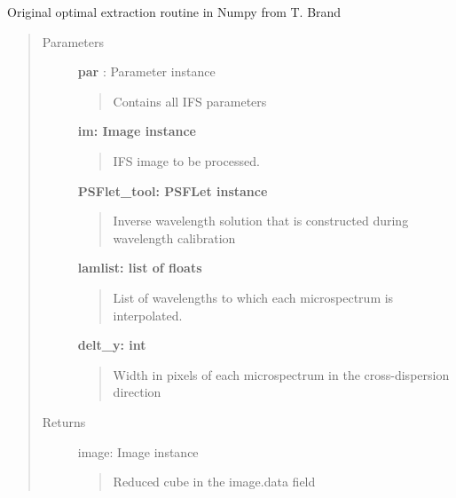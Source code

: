 \documentclass[letterpaper,10pt,english]{sphinxmanual}
\begin{document}

\begin{fulllineitems}
\label{tools:tools.reduction.fitspec_intpix_np}
Original optimal extraction routine in Numpy from T. Brand
\begin{quote}\begin{description}
\item[{Parameters}] \leavevmode
\textbf{par} :   Parameter instance
\begin{quote}

Contains all IFS parameters
\end{quote}

\textbf{im:     Image instance}
\begin{quote}

IFS image to be processed.
\end{quote}

\textbf{PSFlet\_tool: PSFLet instance}
\begin{quote}

Inverse wavelength solution that is constructed during wavelength calibration
\end{quote}

\textbf{lamlist: list of floats}
\begin{quote}

List of wavelengths to which each microspectrum is interpolated.
\end{quote}

\textbf{delt\_y: int}
\begin{quote}

Width in pixels of each microspectrum in the cross-dispersion direction
\end{quote}

\item[{Returns}] \leavevmode
image:  Image instance
\begin{quote}

Reduced cube in the image.data field
\end{quote}

\end{description}\end{quote}

\end{fulllineitems}
\end{document}
